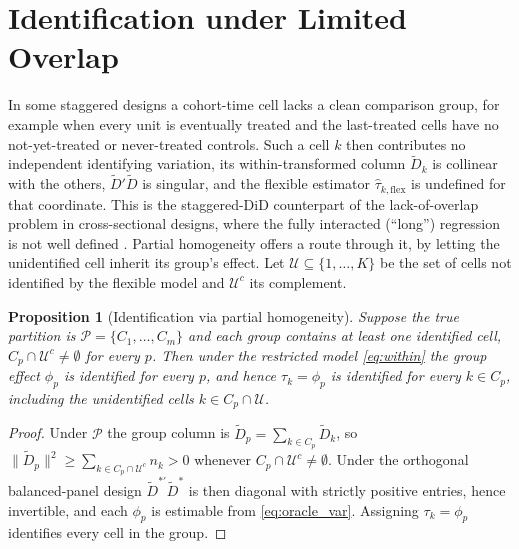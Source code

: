 \documentclass[margin=5in, 12pt]{article}
\newtheorem{proposition}{Proposition}
\newcommand{\1}{\mathbbm{1}}
\newcommand{\Dtd}{\tilde{D}}
\begin{document}
\newpage
\appendix

\section{Identification under Limited Overlap}
\label{app:identification}

In some staggered designs a cohort-time cell lacks a clean comparison group, for
example when every unit is eventually treated and the last-treated cells have no
not-yet-treated or never-treated controls. Such a cell $k$ then contributes no
independent identifying variation, its within-transformed column $\tilde{D}_k$ is
collinear with the others, $\Dtd'\Dtd$ is singular, and the flexible estimator
$\hat{\tau}_{k,\text{flex}}$ is undefined for that coordinate. This is the
staggered-DiD counterpart of the lack-of-overlap problem in cross-sectional
designs, where the fully interacted (``long'') regression is not well defined
\citep{kwon2026}. Partial homogeneity offers a route through it, by letting the
unidentified cell inherit its group's effect. Let
$\mathcal{U} \subseteq \{1,\ldots,K\}$ be the set of cells not identified by the
flexible model and $\mathcal{U}^c$ its complement.

\begin{proposition}[Identification via partial homogeneity]
  \label{prop:identification}
  Suppose the true partition is $\mathcal{P} = \{C_1,\ldots,C_m\}$ and each group
  contains at least one identified cell, $C_p \cap \mathcal{U}^c \neq \emptyset$
  for every $p$. Then under the restricted model \eqref{eq:within} the group
  effect $\phi_p$ is identified for every $p$, and hence $\tau_k = \phi_p$ is
  identified for every $k \in C_p$, including the unidentified cells
  $k \in C_p \cap \mathcal{U}$.
\end{proposition}

\begin{proof}
Under $\mathcal{P}$ the group column is $\Dtd_p = \sum_{k\in C_p}\tilde{D}_k$, so
$\|\Dtd_p\|^2 \geq \sum_{k \in C_p \cap \mathcal{U}^c} n_k > 0$ whenever
$C_p \cap \mathcal{U}^c \neq \emptyset$. Under the orthogonal balanced-panel
design $\Dtd^{*\prime}\Dtd^*$ is then diagonal with strictly positive entries,
hence invertible, and each $\phi_p$ is estimable from \eqref{eq:oracle_var}.
Assigning $\tau_k = \phi_p$ identifies every cell in the group.
\end{proof}
\end{document}

